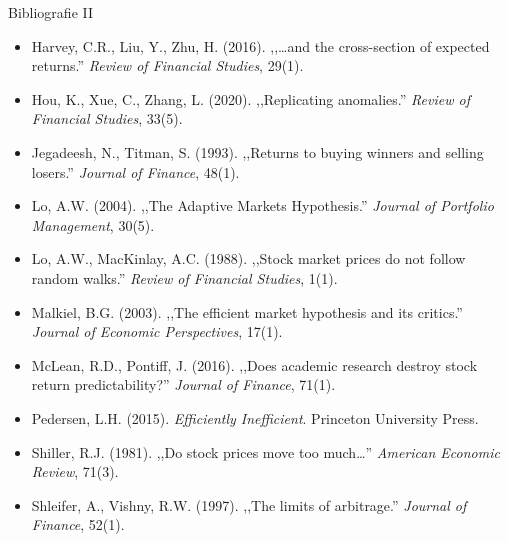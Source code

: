 \documentclass[9pt, aspectratio=169, t]{beamer}
\theoremstyle{definition}
\newenvironment{cminipage}[1]{%
    \par\noindent\hfill\begin{minipage}{#1}\ignorespaces
}{%
    \end{minipage}\hfill\null\par
}
\begin{document}
\begin{frame}[shrink=15]{Bibliografie II}
\begin{cminipage}{0.95\textwidth}
{\small
\begin{itemize}\setlength{\itemsep}{2pt}
    \item Harvey, C.R., Liu, Y., Zhu, H. (2016). ,,\ldots and the cross-section of expected returns.'' \textit{Review of Financial Studies}, 29(1).
    \item Hou, K., Xue, C., Zhang, L. (2020). ,,Replicating anomalies.'' \textit{Review of Financial Studies}, 33(5).
    \item Jegadeesh, N., Titman, S. (1993). ,,Returns to buying winners and selling losers.'' \textit{Journal of Finance}, 48(1).
    \item Lo, A.W. (2004). ,,The Adaptive Markets Hypothesis.'' \textit{Journal of Portfolio Management}, 30(5).
    \item Lo, A.W., MacKinlay, A.C. (1988). ,,Stock market prices do not follow random walks.'' \textit{Review of Financial Studies}, 1(1).
    \item Malkiel, B.G. (2003). ,,The efficient market hypothesis and its critics.'' \textit{Journal of Economic Perspectives}, 17(1).
    \item McLean, R.D., Pontiff, J. (2016). ,,Does academic research destroy stock return predictability?'' \textit{Journal of Finance}, 71(1).
    \item Pedersen, L.H. (2015). \textit{Efficiently Inefficient}. Princeton University Press.
    \item Shiller, R.J. (1981). ,,Do stock prices move too much\ldots'' \textit{American Economic Review}, 71(3).
    \item Shleifer, A., Vishny, R.W. (1997). ,,The limits of arbitrage.'' \textit{Journal of Finance}, 52(1).
\end{itemize}
}
\end{cminipage}
\end{frame}
\end{document}
